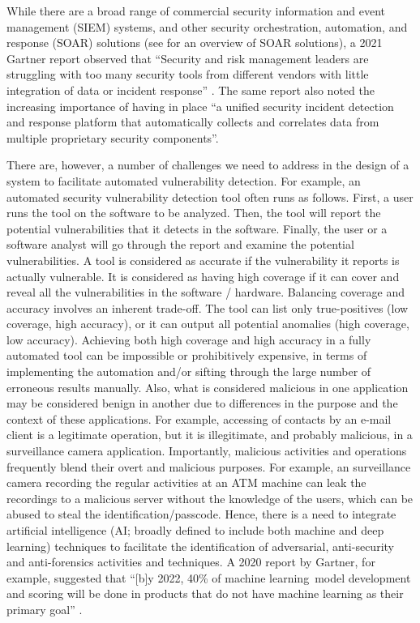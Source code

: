 While there are a broad range of commercial security information and
event management (SIEM) systems, and other security orchestration,
automation, and response (SOAR) solutions
(see \cite{DBLP:journals/csur/IslamBN19} for an overview of SOAR
solutions), a 2021 Gartner report observed that ``Security and risk
management leaders are struggling with too many security tools from
different vendors with little integration of data or incident
response'' \cite{FirstbrookLawsonGartner2021}. The same report also
noted the increasing importance of having in place ``a unified
security incident detection and response platform that automatically
collects and correlates data from multiple proprietary security
components''.

There are, however, a number of challenges we need to address in the
design of a system to facilitate automated vulnerability detection.
For example, an automated security vulnerability detection tool often
runs as follows. First, a user runs the tool on the software to be
analyzed. Then, the tool will report the potential vulnerabilities
that it detects in the software. Finally, the user or a software
analyst will go through the report and examine the potential
vulnerabilities. A tool is considered as accurate if the vulnerability
it reports is actually vulnerable. It is considered as having high
coverage if it can cover and reveal all the vulnerabilities in the
software / hardware. Balancing coverage and accuracy involves an
inherent trade-off. The tool can list only true-positives (low
coverage, high accuracy), or it can output all potential anomalies
(high coverage, low accuracy). Achieving both high coverage and high
accuracy in a fully automated tool can be impossible or prohibitively
expensive, in terms of implementing the automation and/or sifting
through the large number of erroneous results manually.
Also, what is considered malicious in one application may be
considered benign in another due to differences in the purpose and the
context of these applications. For example, accessing of contacts by
an e-mail client is a legitimate operation, but it is illegitimate,
and probably malicious, in a surveillance camera
application. Importantly, malicious activities and operations
frequently blend their overt and malicious purposes. For example, an
surveillance camera recording the regular activities at an ATM machine
can leak the recordings to a malicious server without the knowledge of
the users, which can be abused to steal the
identification/passcode. Hence, there is a need to integrate
artificial intelligence (AI; broadly defined to include both machine
and deep learning) techniques to facilitate the identification of
adversarial, anti-security and anti-forensics activities and
techniques. A 2020 report by Gartner, for example, suggested that
``[b]y 2022, 40\% of machine learning~model development and scoring
will be done in products that do not have machine learning as their
primary goal'' \cite{RichardsonGartner2020}.

